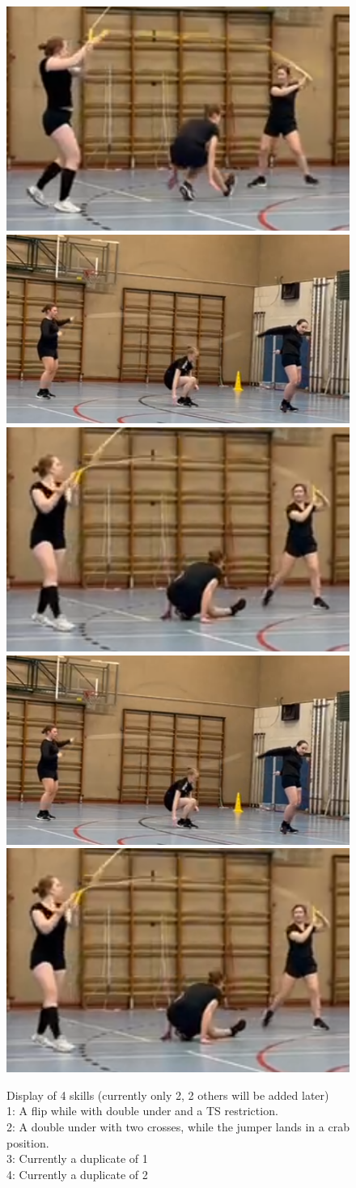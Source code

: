 \begin{figure}
    \includegraphics[height=0.14\linewidth]{img/dd3-du-crab-cross-7}
    \includegraphics[height=0.14\linewidth]{img/dd3-du-flip-ts-8}
    \includegraphics[height=0.14\linewidth]{img/dd3-du-crab-cross-8}
    \includegraphics[height=0.14\linewidth]{img/dd3-du-flip-ts-8}
    \includegraphics[height=0.14\linewidth]{img/dd3-du-crab-cross-8}
    \label{fig:skills}
    \caption[DD3 skill flows]{
        Display of 4 skills (currently only 2, 2 others will be added later) \\
        1: A flip while with double under and a TS restriction. \\
        2: A double under with two crosses, while the jumper lands in a crab position. \\
        3: Currently a duplicate of 1 \\
        4: Currently a duplicate of 2 \\
    }
\end{figure}